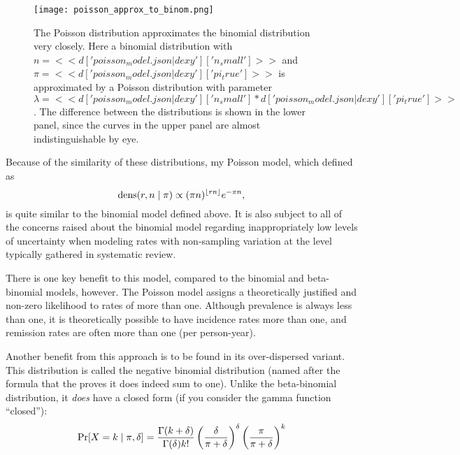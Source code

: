 \begin{figure}
\begin{center}
\texttt{[image: poisson\_approx\_to\_binom.png]}
\end{center}
\caption{The Poisson distribution approximates the binomial
  distribution very closely. Here a binomial distribution with
  $n=<<d['poisson_model.json|dexy']['n_small']>>$ and
  $\pi=<<d['poisson_model.json|dexy']['pi_true']>>$ is approximated by
  a Poisson distribution with parameter
  $\lambda=<<d['poisson_model.json|dexy']['n_small'] *
  d['poisson_model.json|dexy']['pi_true']>>$.  The difference between
  the distributions is shown in the lower panel, since the curves in
  the upper panel are almost indistinguishable by eye.}
\label{fig:theory-rate_model-poisson_approx_to_binom}
\end{figure}

Because of the similarity of these distributions, my Poisson model,
which defined as
\[
\operatorname{dens}(r,n\;|\; \pi) \propto (\pi n)^{\lfloor rn\rfloor} e^{-\pi n},
\]
is quite similar to the binomial model defined above.  It is also subject to all of the concerns raised about the
binomial model regarding inappropriately low levels of uncertainty
when modeling rates with non-sampling variation at the level typically
gathered in systematic review.

There is one key benefit to this model, compared to the binomial and
beta-binomial models, however.  The Poisson model assigns a
theoretically justified and non-zero likelihood to rates of more than
one.  Although prevalence is always less than one, it is theoretically
possible to have incidence rates more than one, and remission rates
are often more than one (per person-year).

Another benefit from this approach is to be found in its
over-dispersed variant.  This distribution
is called the negative binomial distribution (named after the formula
that the proves it does indeed sum to one).  Unlike the beta-binomial
distribution, it \emph{does} have a closed form (if you consider the gamma function ``closed''):
\[
\operatorname{Pr}[X = k\;|\; \pi, \delta] = \frac{\Gamma(k+\delta)}{\Gamma(\delta)k!}
\left(\frac{\delta}{\pi+\delta}\right)^\delta \left(\frac{\pi}{\pi+\delta}\right)^k
\]

